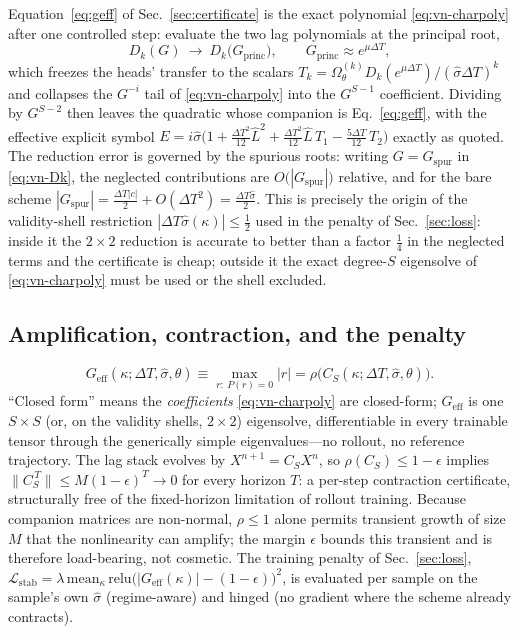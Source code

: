 \documentclass[11pt]{article}
\theoremstyle{plain}
\theoremstyle{definition}
\newcommand{\DT}{\Delta T}
\begin{document}
Equation~\eqref{eq:geff} of Sec.~\ref{sec:certificate} is the exact polynomial
\eqref{eq:vn-charpoly} after one controlled step: evaluate the two lag
polynomials at the principal root,
\begin{equation}
D_k(G)\ \longrightarrow\ D_k\bigl(G_{\mathrm{princ}}\bigr),
\qquad G_{\mathrm{princ}}\approx e^{\mu\DT},
\label{eq:vn-reduction}
\end{equation}
which freezes the heads' transfer to the scalars
$T_k=\Omega^{(k)}_\theta D_k(e^{\mu\DT})/(\hat\sigma\DT)^{k}$ and
collapses the $G^{-i}$ tail of \eqref{eq:vn-charpoly} into the
$G^{S-1}$ coefficient. Dividing by $G^{S-2}$ then leaves the quadratic
whose companion is Eq.~\eqref{eq:geff}, with the effective explicit symbol
$E=i\hat\sigma\bigl(1+\tfrac{\DT^{2}}{12}\hat L^{2}
+\tfrac{\DT^{2}}{12}\hat L\,T_1-\tfrac{5\DT}{12}\,T_2\bigr)$
exactly as quoted. The reduction error is governed by the spurious
roots: writing $G=G_{\mathrm{spur}}$ in \eqref{eq:vn-Dk}, the neglected
contributions are $O\bigl(|G_{\mathrm{spur}}|\bigr)$ relative, and for
the bare scheme $|G_{\mathrm{spur}}|=\tfrac{\DT|c|}{2}+O(\DT^{2})
=\tfrac{\DT\hat\sigma}{2}$. This is precisely the origin of the
validity-shell restriction $|\DT\hat\sigma(\kappa)|\le\tfrac12$ used in
the penalty of Sec.~\ref{sec:loss}: inside it the $2\times2$ reduction is accurate
to better than a factor $\tfrac{1}{4}$ in the neglected terms and the
certificate is cheap; outside it the exact degree-$S$ eigensolve of
\eqref{eq:vn-charpoly} must be used or the shell excluded.

\subsection{Amplification, contraction, and the penalty}

\begin{equation}
G_{\mathrm{eff}}(\kappa;\DT,\hat\sigma,\theta)
\equiv\max_{r:\ P(r)=0}|r|
=\rho\bigl(C_S(\kappa;\DT,\hat\sigma,\theta)\bigr).
\label{eq:vn-geff}
\end{equation}
``Closed form'' means the \emph{coefficients} \eqref{eq:vn-charpoly} are
closed-form; $G_{\mathrm{eff}}$ is one $S\times S$ (or, on the validity
shells, $2\times2$) eigensolve, differentiable in every trainable tensor
through the generically simple eigenvalues---no rollout, no reference
trajectory. The lag stack evolves by $X^{n+1}=C_S X^{n}$, so
$\rho(C_S)\le1-\epsilon$ implies
$\|C_S^{\,T}\|\le M(1-\epsilon)^{T}\to0$ for every horizon $T$: a
per-step contraction certificate, structurally free of the fixed-horizon
limitation of rollout training. Because companion matrices are
non-normal, $\rho\le1$ alone permits transient growth of size $M$ that
the nonlinearity can amplify; the margin $\epsilon$ bounds this
transient and is therefore load-bearing, not cosmetic. The training
penalty of Sec.~\ref{sec:loss},
$\mathcal{L}_{\mathrm{stab}}
=\lambda\,\mathrm{mean}_\kappa\,
\mathrm{relu}\bigl(|G_{\mathrm{eff}}(\kappa)|-(1-\epsilon)\bigr)^2$,
is evaluated per sample on the sample's own $\hat\sigma$ (regime-aware)
and hinged (no gradient where the scheme already contracts).
\end{document}
